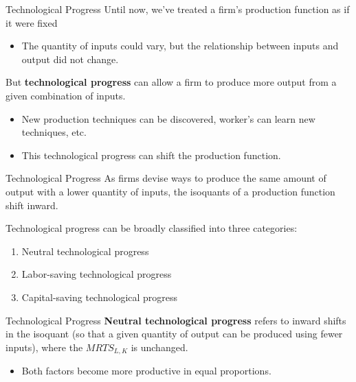 \documentclass[11pt,t]{beamer}
\begin{document}
\begin{frame}{Technological Progress}
  Until now, we've treated a firm's production function as if it were fixed
  
  \bigskip
  \begin{itemize}
    \item The quantity of inputs could vary, but the relationship between inputs and output did not change.
  \end{itemize}

  \bigskip
  But \textbf{technological progress} can allow a firm to produce more output from a given combination of inputs.

  \begin{itemize}
    \item New production techniques can be discovered, worker's can learn new techniques, etc.

    \item This technological progress can shift the production function.
  \end{itemize}
\end{frame}

\begin{frame}{Technological Progress}
  As firms devise ways to produce the same amount of output with a lower quantity of inputs, the isoquants of a production function shift inward.
  
  \bigskip
  Technological progress can be broadly classified into three categories:
  \begin{enumerate}
    \item Neutral technological progress
    
    \item Labor-saving technological progress
    
    \item Capital-saving technological progress
  \end{enumerate}
\end{frame}
  
\begin{frame}{Technological Progress}
  \textbf{Neutral technological progress} refers to inward shifts in the isoquant (so that a given quantity of output can be produced using fewer inputs), where the $MRTS_{L,K}$ is unchanged.
  
  \bigskip
  \begin{itemize}
    \item Both factors become more productive in equal proportions.
  \end{itemize}
\end{frame}
\end{document}
